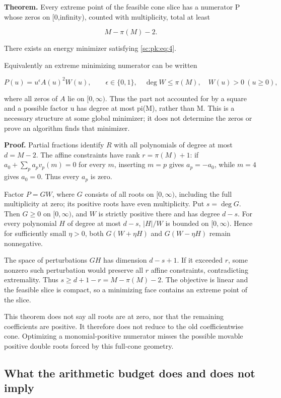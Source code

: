 \documentclass[11pt,a4paper]{article}
\theoremstyle{definition}
\theoremstyle{remark}
\theoremstyle{plain}
\numberwithin{equation}{section}
\begin{document}
\textbf{Theorem.} Every extreme point of the feasible cone slice has a
numerator P whose zeros on {[}0,infinity), counted with multiplicity,
total at least

\[
M-\pi(M)-2.
\tag{PK.4}\label{sc:pk:eq:4}
\]

There exists an energy minimizer satisfying \eqref{sc:pk:eq:4}.

Equivalently an extreme minimizing numerator can be written

\[
P(u)=u^\epsilon A(u)^2 W(u),\qquad \epsilon\in\{0,1\},
\quad \deg W\le\pi(M),\quad W(u)>0\ (u\ge0),
\]

where all zeros of $A$ lie on $[0,\infty)$. Thus the part not accounted
for by a square and a possible factor u has degree at most pi(M), rather
than M. This is a necessary structure at some global minimizer; it does
not determine the zeros or prove an algorithm finds that minimizer.

\textbf{Proof.} Partial fractions identify $R$ with all polynomials of degree at most $d=M-2$. The affine constraints have rank $r=\pi(M)+1$: if $a_0+\sum_pa_pv_p(m)=0$ for every $m$, inserting $m=p$ gives $a_p=-a_0$, while $m=4$ gives $a_0=0$. Thus every $a_p$ is zero.

Factor $P=GW$, where $G$ consists of all roots on $[0,\infty)$, including the full multiplicity at zero; its positive roots have even multiplicity. Put $s=\deg G$. Then $G\ge0$ on $[0,\infty)$, and $W$ is strictly positive there and has degree $d-s$. For every polynomial $H$ of degree at most $d-s$, $|H|/W$ is bounded on $[0,\infty)$. Hence for sufficiently small $\eta>0$, both $G(W+\eta H)$ and $G(W-\eta H)$ remain nonnegative.

The space of perturbations $GH$ has dimension $d-s+1$. If it exceeded $r$, some nonzero such perturbation would preserve all $r$ affine constraints, contradicting extremality. Thus $s\ge d+1-r=M-\pi(M)-2$. The objective is linear and the
feasible slice is compact, so a minimizing face contains an extreme
point of the slice.

This theorem does not say all roots are at zero, nor that the remaining
coefficients are positive. It therefore does not reduce to the old
coefficientwise cone. Optimizing a monomial-positive numerator misses
the possible movable positive double roots forced by this full-cone
geometry.

\subsection{What the arithmetic budget does and does not
imply}\label{sc:pk:what-the-arithmetic-budget-does-and-does-not-imply}
\end{document}
